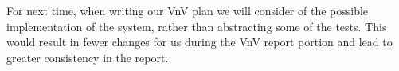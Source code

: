 \documentclass[12pt, titlepage]{article}
\begin{document}
    For next time, when writing our VnV plan we will consider of the possible implementation of the system, rather than abstracting some of the tests. This would result in fewer changes for us during the VnV report portion and lead to greater consistency in the report.




\end{document}

